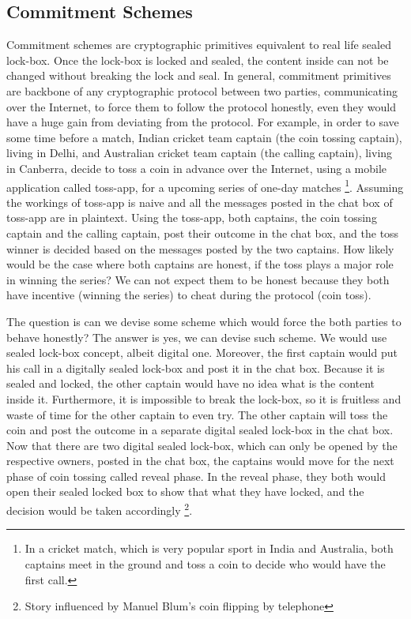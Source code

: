 {     \subsection{Commitment Schemes}   
     \label{sec:commscheme}
      Commitment schemes are cryptographic primitives equivalent to real life sealed lock-box.
      Once the lock-box is locked and sealed, the content inside  can not be changed without breaking the lock and seal. 
      In general, commitment primitives 
      are backbone of any cryptographic protocol between two parties, communicating over the Internet, to force them  to  follow the 
      protocol honestly, even they would have a huge gain from deviating 
      from the protocol. For example, in order to save some time before a match, Indian cricket team captain (the coin tossing captain), living in Delhi, and Australian cricket 
      team captain (the calling captain), living in Canberra, decide 
      to toss a coin in advance over the Internet, using a mobile application  called toss-app, for a  upcoming series of one-day matches
      \footnote{
      In a cricket match, which is very popular sport in India and Australia, both captains meet in the ground and toss a coin to 
      decide who would have the first call.}.  Assuming the workings of toss-app is naive and all the messages posted in 
      the chat box of toss-app are in plaintext.   Using the toss-app,  both captains, the coin tossing captain and the calling captain,  post their 
      outcome in the chat box,  and the toss winner is decided based on the messages posted by the two captains.  
	 How likely would be the case where both captains are honest, if the toss plays a major role in winning the series? 
	 We can not expect them to be honest because they both have incentive (winning the series) to cheat during the 
	 protocol (coin toss).      
      
      The question is can we devise some scheme which would force the both parties to behave honestly? 
      The answer is yes, we can devise such scheme.  We would use sealed lock-box concept, albeit digital one. Moreover, 
      the first captain would put his call in a digitally sealed lock-box and post it in the chat box. Because it is sealed and 
      locked, the other captain would have no idea what is the content inside it. Furthermore, it is impossible to break 
      the lock-box, so it is fruitless and waste of time for the other captain to even try. The other captain will toss the coin 
      and post the outcome in a separate digital sealed lock-box  in the chat box.  Now that there are two digital sealed lock-box, which can 
      only be opened by the respective owners,  posted in the chat box,  the captains would move for the next phase of coin tossing  called reveal phase. 
      In the reveal phase, they both would open their sealed locked box to show that what they have locked, 
      and the decision would be taken accordingly \footnote{Story influenced by Manuel Blum's coin flipping by telephone}. 
      
}
